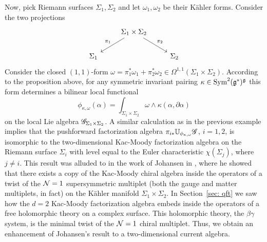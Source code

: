 Now, pick Riemann surfaces $\Sigma_1,\Sigma_2$ and let $\omega_1,\omega_2$ be their K\"{a}hler forms. 
Consider the two projections
\[
\begin{tikzcd}
& \Sigma_1 \times \Sigma_2 \arrow[dl,"\pi_1"'] \arrow[dr,"\pi_2"] & \\
\Sigma_1 & & \Sigma_2
\end{tikzcd}
\]
Consider the closed $(1,1)$-form $\omega = \pi_1^* \omega_1 + \pi_2^* \omega_2 \in \Omega^{1,1}(\Sigma_1 \times \Sigma_2)$. 
According to the proposition above, for any symmetric invariant pairing $\kappa \in {\rm Sym}^2 (\mathfrak g^*)^\mathfrak g$ this form determines a bilinear local functional
\[
\phi_{\kappa,\omega}(\alpha) = \int_{\Sigma_1 \times \Sigma_2} \omega \wedge \kappa(\alpha, \partial \alpha) 
\]
on the local Lie algebra $\mathscr G_{\Sigma_1\times \Sigma_2}$.
A similar calculation as in the previous example implies that the pushforward factorization algebra $\pi_{i*}\mathbb U_{\phi_{\kappa, \omega}}\mathscr G$, $i=1,2$, is isomorphic to the two-dimensional  Kac-Moody factorization algebra on the Riemann surface $\Sigma_i$ with level equal to the Euler characteristic $\chi(\Sigma_j)$, where $j \ne i$. 
This result was alluded to  in the work of Johansen in \cite{JohansenKM}, 
where he showed that there exists a copy of the Kac-Moody chiral algebra inside the operators of a twist of the $\mathcal N=1$ supersymmetric multiplet (both the gauge and matter multiplets, in fact) on the K\"{a}hler manifold $\Sigma_1 \times \Sigma_2$. 
In Section~\ref{sec: qft} we saw how the $d = 2$ Kac-Moody factorization algebra embeds inside the operators of a free holomorphic theory on a complex surface. 
This holomorphic theory, the $\beta\gamma$ system, is the minimal twist of the $\mathcal N=1$ chiral multiplet.
Thus, we obtain an enhancement of Johansen's result to a two-dimensional current algebra.


